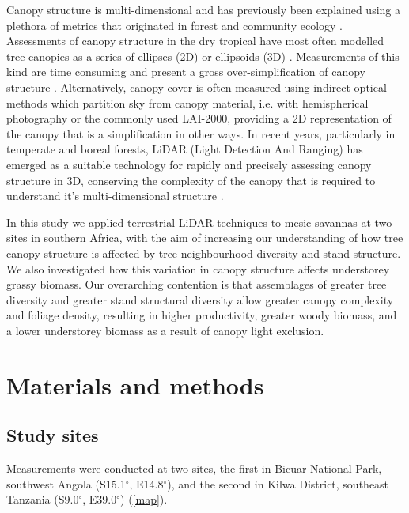 \documentclass[11pt,a4paper]{article}
\begin{document}
Canopy structure is multi-dimensional and has previously been explained using a plethora of metrics that originated in forest and community ecology \citep{}. Assessments of canopy structure in the dry tropical have most often modelled tree canopies as a series of ellipses (2D) or ellipsoids (3D) \citep{}. Measurements of this kind are time consuming and present a gross over-simplification of canopy structure \citep{}. Alternatively, canopy cover is often measured using indirect optical methods which partition sky from canopy material, i.e. with hemispherical photography or the commonly used LAI-2000, providing a 2D representation of the canopy that is a simplification in other ways. In recent years, particularly in temperate and boreal forests, LiDAR (Light Detection And Ranging) has emerged as a suitable technology for rapidly and precisely assessing canopy structure in 3D, conserving the complexity of the canopy that is required to understand it's multi-dimensional structure \citep{}.

In this study we applied terrestrial LiDAR techniques to mesic savannas at two sites in southern Africa, with the aim of increasing our understanding of how tree canopy structure is affected by tree neighbourhood diversity and stand structure. We also investigated how this variation in canopy structure affects understorey grassy biomass. Our overarching contention is that assemblages of greater tree diversity and greater stand structural diversity allow greater canopy complexity and foliage density, resulting in higher productivity, greater woody biomass, and a lower understorey biomass as a result of canopy light exclusion. 

\section{Materials and methods}

\subsection{Study sites}

Measurements were conducted at two sites, the first in Bicuar National Park, southwest Angola (S15.1$^\circ$, E14.8$^\circ$), and the second in Kilwa District, southeast Tanzania (S9.0$^\circ$, E39.0$^\circ$) (\autoref{map}).
\end{document}
